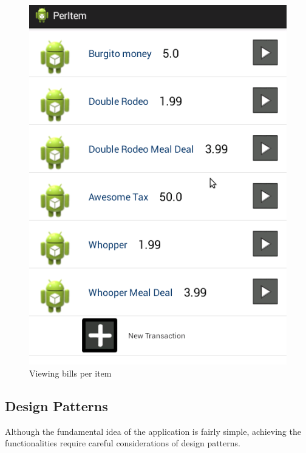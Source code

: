 \documentclass[a4paper,11pt]{article}
\begin{document}
\begin{figure}[ht]
\begin{center}
\advance\leftskip-3cm
\advance\rightskip-3cm
\includegraphics[keepaspectratio=true,scale=0.5]{perItem}
\caption{Viewing bills per item}
\label{visina8}
\end{center}
\end{figure}

\subsection*{Design Patterns}
Although the fundamental idea of the application is fairly simple, achieving the functionalities require careful considerations of design patterns. 
\end{document}
